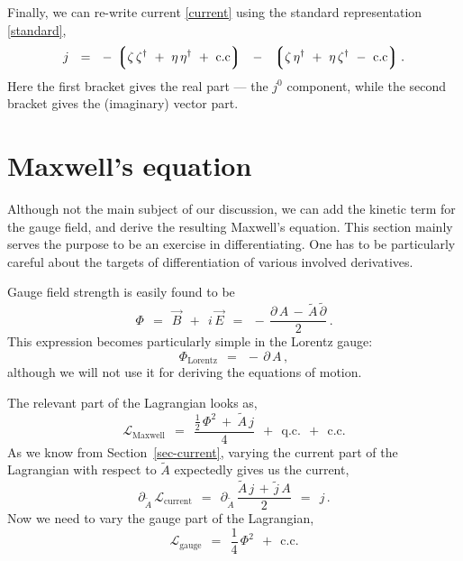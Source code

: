 \documentclass[epsfig,12pt]{article}
\newcommand{\cell}{{\mathcal L}}
\newcommand{\p}{\partial}
\newcommand{\wt}{\widetilde}
\newcommand{\lgr}{\left\lgroup}
\newcommand{\rgr}{\right\rgroup}
\begin{document}
	Finally, we can re-write current \eqref{current} using the standard representation \eqref{standard},
\begin{equation}
	j	~~=~~	-\, \lgr \zeta\,\zeta^\dag ~+~ \eta\,\eta^\dag ~+~ \text{c.c} \rgr  ~~-~~  
			\lgr \zeta\,\eta^\dag ~+~ \eta\,\zeta^\dag ~-~ \text{c.c} \rgr.
\end{equation}
	Here the first bracket gives the real part --- the $ j^0 $ component, while the second bracket gives
	the (imaginary) vector part.




\section{Maxwell's equation}
	Although not the main subject of our discussion, we can add the kinetic term for the gauge field,
	and derive the resulting Maxwell's equation.
	This section mainly serves the purpose to be an exercise in differentiating.
	One has to be particularly careful about the targets of differentiation of various involved derivatives.

	Gauge field strength is easily found to be
\begin{equation}
	\Phi	~~=~~	\vec B ~~+~~ i\,\vec E	~~=~~	-\, \frac{\p\,A \,-\, \wt A\,\wt\p} 2\,.
\end{equation}
	This expression becomes particularly simple in the Lorentz gauge:
\begin{equation}
	\Phi_\text{Lorentz}	~~=~~ -\, \p\, A\,,
\end{equation}
	although we will not use it for deriving the equations of motion.

	The relevant part of the Lagrangian looks as,
\begin{equation}
	\cell_\text{Maxwell}	~~=~~	\frac{ \frac 1 2\, \Phi^2 ~+~ \wt A\,j } 4  ~~+~~  \text{q.c.}  ~~+~~  \text{c.c.}
\end{equation}
	As we know from Section~\ref{sec-current}, varying the current part of the Lagrangian with respect to $ \wt A $
	expectedly gives us the current,
\begin{equation}
	\p_{\wt A}\,\cell_\text{current}	~~=~~	\p_{\wt A}\, \frac{\wt A\,j \,+\, \wt j\, A} 2	~~=~~	j\,.
\end{equation}
	Now we need to vary the gauge part of the Lagrangian,
\begin{equation}
	\cell_\text{gauge}	~~=~~	\frac 1 4\, \Phi^2  ~~+~~  \text{c.c.}
\end{equation}
	
\end{document}
